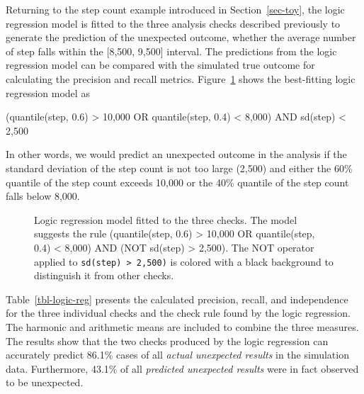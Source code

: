 \documentclass[
  12pt,
]{interact}
\begin{document}
Returning to the step count example introduced in Section~\ref{sec-toy},
the logic regression model is fitted to the three analysis checks
described previously to generate the prediction of the unexpected
outcome, whether the average number of step falls within the {[}8,500,
9,500{]} interval. The predictions from the logic regression model can
be compared with the simulated true outcome for calculating the
precision and recall metrics. Figure~\ref{fig-logic-reg} shows the
best-fitting logic regression model as

(quantile(step, 0.6) \textgreater{} 10,000 OR quantile(step, 0.4)
\textless{} 8,000) AND sd(step) \textless{} 2,500

In other words, we would predict an unexpected outcome in the analysis
if the standard deviation of the step count is not too large (2,500) and
either the 60\% quantile of the step count exceeds 10,000 or the 40\%
quantile of the step count falls below 8,000.

\label{cell-fig-logic-reg}
\begin{figure}[H]


\caption{\label{fig-logic-reg}Logic regression model fitted to the three
checks. The model suggests the rule (quantile(step, 0.6) \textgreater{}
10,000 OR quantile(step, 0.4) \textless{} 8,000) AND (NOT sd(step)
\textgreater{} 2,500). The NOT operator applied to
\texttt{sd(step)\ \textgreater{}\ 2,500)} is colored with a black
background to distinguish it from other checks.}

\end{figure}%

Table~\ref{tbl-logic-reg} presents the calculated precision, recall, and
independence for the three individual checks and the check rule found by
the logic regression. The harmonic and arithmetic means are included to
combine the three measures. The results show that the two checks
produced by the logic regression can accurately predict 86.1\% cases of
all \emph{actual unexpected results} in the simulation data.
Furthermore, 43.1\% of all \emph{predicted unexpected results} were in
fact observed to be unexpected.
\end{document}
